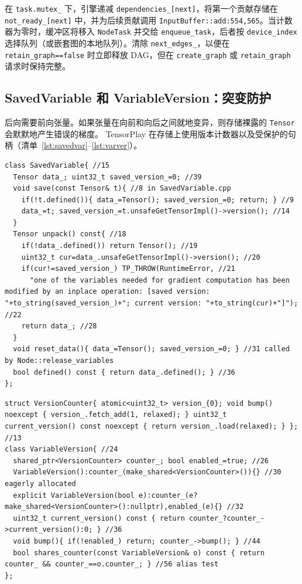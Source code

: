 在 \texttt{task.mutex\_} 下，引擎递减 \texttt{dependencies\_[next]}，将第一个贡献存储在 \texttt{not\_ready\_[next]} 中，并为后续贡献调用 \texttt{InputBuffer::add:554,565}。当计数器为零时，缓冲区将移入 \texttt{NodeTask} 并交给 \texttt{enqueue\_task}，后者按 \texttt{device\_index} 选择队列（或嵌套图的本地队列）。清除 \texttt{next\_edges\_}，以便在 \texttt{retain\_graph==false} 时立即释放 DAG，但在 \texttt{create\_graph} 或 \texttt{retain\_graph} 请求时保持完整。

\subsection{SavedVariable 和 VariableVersion：突变防护}
\label{subsec:savedvar}

后向需要前向张量。如果张量在向前和向后之间就地变异，则存储裸露的 \texttt{Tensor} 会默默地产生错误的梯度。 TensorPlay 在存储上使用版本计数器以及受保护的句柄（清单~\ref{lst:savedvar}--\ref{lst:varver}）。

\begin{lstlisting}[caption={guarded handle.}, label=lst:savedvar]
class SavedVariable{ //15
  Tensor data_; uint32_t saved_version_=0; //39
  void save(const Tensor& t){ //8 in SavedVariable.cpp
    if(!t.defined()){ data_=Tensor(); saved_version_=0; return; } //9
    data_=t; saved_version_=t.unsafeGetTensorImpl()->version(); //14
  }
  Tensor unpack() const{ //18
    if(!data_.defined()) return Tensor(); //19
    uint32_t cur=data_.unsafeGetTensorImpl()->version(); //20
    if(cur!=saved_version_) TP_THROW(RuntimeError, //21
      "one of the variables needed for gradient computation has been modified by an inplace operation: [saved version: "+to_string(saved_version_)+"; current version: "+to_string(cur)+"]"); //22
    return data_; //28
  }
  void reset_data(){ data_=Tensor(); saved_version_=0; } //31 called by Node::release_variables
  bool defined() const { return data_.defined(); } //36
};
\end{lstlisting}

\begin{lstlisting}[caption={atomic counter.}, label=lst:varver]
struct VersionCounter{ atomic<uint32_t> version_{0}; void bump() noexcept { version_.fetch_add(1, relaxed); } uint32_t current_version() const noexcept { return version_.load(relaxed); } }; //13
class VariableVersion{ //24
  shared_ptr<VersionCounter> counter_; bool enabled_=true; //26
  VariableVersion():counter_(make_shared<VersionCounter>()){} //30 eagerly allocated
  explicit VariableVersion(bool e):counter_(e?make_shared<VersionCounter>():nullptr),enabled_(e){} //32
  uint32_t current_version() const { return counter_?counter_->current_version():0; } //36
  void bump(){ if(!enabled_) return; counter_->bump(); } //44
  bool shares_counter(const VariableVersion& o) const { return counter_ && counter_==o.counter_; } //56 alias test
};
\end{lstlisting}

